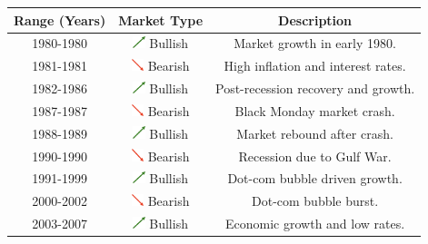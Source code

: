 \documentclass{article}
\begin{document}
\begin{table}[H]
    \centering
    \begin{tabular}{|c|c|c|}
        \hline
        Range (Years) & Market Type & Description \\
        \hline
        1980-1980 & \includegraphics[height=10pt]{green_line.png} Bullish & Market growth in early 1980. \\
        1981-1981 & \includegraphics[height=10pt]{red_line.png} Bearish & High inflation and interest rates. \\
        1982-1986 & \includegraphics[height=10pt]{green_line.png} Bullish & Post-recession recovery and growth. \\
        1987-1987 & \includegraphics[height=10pt]{red_line.png} Bearish & Black Monday market crash. \\
        1988-1989 & \includegraphics[height=10pt]{green_line.png} Bullish & Market rebound after crash. \\
        1990-1990 & \includegraphics[height=10pt]{red_line.png} Bearish & Recession due to Gulf War. \\
        1991-1999 & \includegraphics[height=10pt]{green_line.png} Bullish & Dot-com bubble driven growth. \\
        2000-2002 & \includegraphics[height=10pt]{red_line.png} Bearish & Dot-com bubble burst. \\
        2003-2007 & \includegraphics[height=10pt]{green_line.png} Bullish & Economic growth and low rates. \\

\end{tabular}
\end{table}
\end{document}
